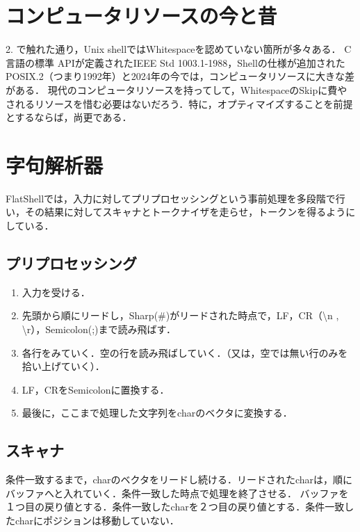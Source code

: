 \documentclass{article}
\begin{document}
\newpage

\section{コンピュータリソースの今と昔}
2. で触れた通り，Unix shellではWhitespaceを認めていない箇所が多々ある．\newline
C言語の標準 APIが定義されたIEEE Std 1003.1-1988，Shellの仕様が追加されたPOSIX.2（つまり1992年）と2024年の今では，コンピュータリソースに大きな差がある．\newline
現代のコンピュータリソースを持ってして，WhitespaceのSkipに費やされるリソースを惜む必要はないだろう．特に，オプティマイズすることを前提とするならば，尚更である．

\newpage

\section{字句解析器}
FlatShellでは，入力に対してプリプロセッシングという事前処理を多段階で行い，その結果に対してスキャナとトークナイザを走らせ，トークンを得るようにしている．

\subsection{プリプロセッシング}
\begin{enumerate}
    \item 入力を受ける．
    \item 先頭から順にリードし，Sharp(\#)がリードされた時点で，LF，CR（\textbackslash n , \textbackslash r），Semicolon(;)まで読み飛ばす．
    \item 各行をみていく．空の行を読み飛ばしていく．（又は，空では無い行のみを拾い上げていく）．
    \item LF，CRをSemicolonに置換する．
    \item 最後に，ここまで処理した文字列をcharのベクタに変換する．
\end{enumerate}
\subsection{スキャナ}
条件一致するまで，charのベクタをリードし続ける．リードされたcharは，順にバッファへと入れていく．条件一致した時点で処理を終了させる．\newline
バッファを１つ目の戻り値とする．条件一致したcharを２つ目の戻り値とする．条件一致したcharにポジションは移動していない．
\end{document}
